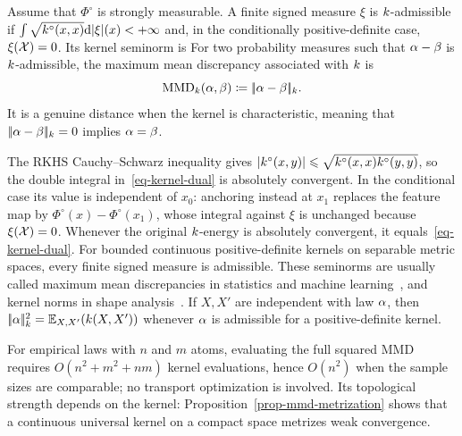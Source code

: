 \begin{defn}\label{def-kernel-mmd-norm}
	Assume that $\Phi^\circ$ is strongly measurable. A finite signed measure $\xi$ is $k$-admissible if
	$\int\sqrt{k^\circ(x,x)}\mathrm{d}|\xi|(x)<+\infty$ and, in the conditionally positive-definite case, $\xi(\mathcal{X})=0$. Its kernel seminorm is
	For two probability measures such that $\alpha-\beta$ is $k$-admissible, the maximum mean discrepancy associated with $k$ is
	\[
		\operatorname{MMD}_{k}(\alpha,\beta)\coloneqq|\!| \alpha-\beta |\!|_{k}.
	\]
It is a genuine distance when the kernel is characteristic, meaning that $|\!| \alpha-\beta |\!|_{k}=0$ implies $\alpha=\beta$.
\end{defn}

The RKHS Cauchy--Schwarz inequality gives $|k^\circ(x,y)|\leqslant\sqrt{k^\circ(x,x)k^\circ(y,y)}$, so the double integral in~\eqref{eq-kernel-dual} is absolutely convergent. In the conditional case its value is independent of $x_0$: anchoring instead at $x_1$ replaces the feature map by $\Phi^\circ(x)-\Phi^\circ(x_1)$, whose integral against $\xi$ is unchanged because $\xi(\mathcal{X})=0$. Whenever the original $k$-energy is absolutely convergent, it equals~\eqref{eq-kernel-dual}. For bounded continuous positive-definite kernels on separable metric spaces, every finite signed measure is admissible. These seminorms are usually called maximum mean discrepancies in statistics and machine learning~\cite{gretton2012kernel,muandet2017kernel}, and kernel norms in shape analysis~\cite{glaunes2004diffeomorphic,vaillant2005surface}. If $X,X'$ are independent with law $\alpha$, then \(|\!| \alpha |\!|_{k}^2=\mathbb{E}_{X,X'}(k(X,X'))\) whenever $\alpha$ is admissible for a positive-definite kernel.

For empirical laws with $n$ and $m$ atoms, evaluating the full squared MMD requires $O(n^2+m^2+nm)$ kernel evaluations, hence $O(n^2)$ when the sample sizes are comparable; no transport optimization is involved. Its topological strength depends on the kernel: Proposition~\ref{prop-mmd-metrization} shows that a continuous universal kernel on a compact space metrizes weak convergence.

